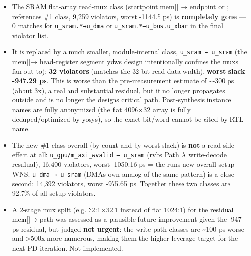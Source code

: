 \begin{record}
\begin{itemize}
\tightlist
\item
  The SRAM flat-array read-mux class (startpoint  mem{[}{]}
   → endpoint  or ;
  reference\textquotesingle s \#1 class, 9,259 violators, worst -1144.5
  ps) is \textbf{completely gone} --- 0 matches for
  \texttt{u\_\allowbreak{}sram.\allowbreak{}*→u\_\allowbreak{}dma} or
  \texttt{u\_\allowbreak{}sram.\allowbreak{}*→u\_\allowbreak{}bus.\allowbreak{}u\_\allowbreak{}xbar}
  in the final violator list.
\item
  It is replaced by a much smaller, module-internal class,
  \texttt{u\_\allowbreak{}sram\ →\ u\_\allowbreak{}sram} (the mem{[}{]}→
   head-register segment ydw\textquotesingle s design
  intentionally confines the mux\textquotesingle s fan-out to):
  \textbf{32 violators} (matches the 32-bit read-data width),
  \textbf{worst slack -947.29 ps}. This is worse than the
  pre-measurement estimate of \textasciitilde-300 ps (about 3x), a real
  and substantial residual, but it no longer propagates outside
   and is no longer the
  design\textquotesingle s critical path. Post-synthesis instance names
  are fully anonymized (the flat 4096×32 array is fully
  deduped/\allowbreak{}optimized by yosys), so the exact bit/word cannot
  be cited by RTL name.
\item
  The new \#1 class overall (by count and by worst slack) is
  \textbf{not} a read-side effect at all:
  \texttt{u\_\allowbreak{}gpu/\allowbreak{}m\_\allowbreak{}axi\_\allowbreak{}wvalid\ →\ u\_\allowbreak{}sram}
  (rvb\textquotesingle s Path A write-decode residual), 16,400
  violators, worst -1050.16 ps = the run\textquotesingle s new overall
  setup WNS. \texttt{u\_\allowbreak{}dma\ →\ u\_\allowbreak{}sram}
  (DMA\textquotesingle s own analog of the same pattern) is a close
  second: 14,392 violators, worst -975.65 ps. Together these two classes
  are 92.7\% of all setup violators.
\item
  A 2-stage mux split (e.g. 32:1×32:1 instead of flat 1024:1) for the
  residual mem{[}{]}→ path was assessed as a plausible
  future improvement given the -947 ps residual, but judged \textbf{not
  urgent}: the write-path classes are \textasciitilde100 ps worse and
  \textgreater500x more numerous, making them the higher-leverage target
  for the next PD iteration. Not implemented.
\end{itemize}


\end{record}
